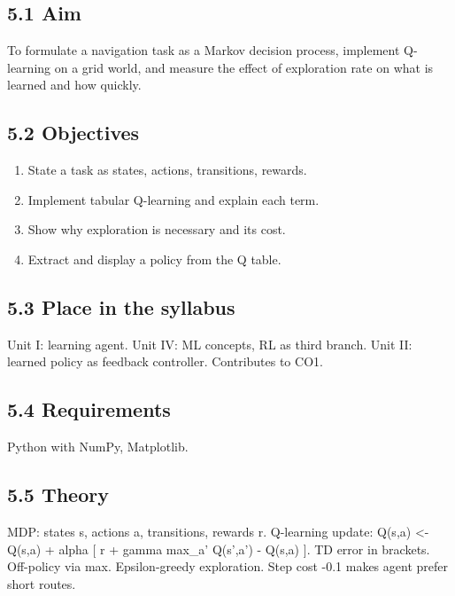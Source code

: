 \documentclass[
]{article}
\providecommand{\tightlist}{%
  \setlength{\itemsep}{0pt}\setlength{\parskip}{0pt}}
\begin{document}
\subsection{5.1 Aim}\label{aim-4}

To formulate a navigation task as a Markov decision process, implement
Q-learning on a grid world, and measure the effect of exploration rate
on what is learned and how quickly.

\subsection{5.2 Objectives}\label{objectives-4}

\begin{enumerate}
\def\labelenumi{\arabic{enumi}.}
\tightlist
\item
  State a task as states, actions, transitions, rewards.
\item
  Implement tabular Q-learning and explain each term.
\item
  Show why exploration is necessary and its cost.
\item
  Extract and display a policy from the Q table.
\end{enumerate}

\subsection{5.3 Place in the syllabus}\label{place-in-the-syllabus-4}

Unit I: learning agent. Unit IV: ML concepts, RL as third branch. Unit
II: learned policy as feedback controller. Contributes to CO1.

\subsection{5.4 Requirements}\label{requirements-4}

Python with NumPy, Matplotlib.

\subsection{5.5 Theory}\label{theory-4}

MDP: states s, actions a, transitions, rewards r. Q-learning update:
Q(s,a) \textless- Q(s,a) + alpha {[} r + gamma max\_a' Q(s',a') - Q(s,a)
{]}. TD error in brackets. Off-policy via max. Epsilon-greedy
exploration. Step cost -0.1 makes agent prefer short routes.
\end{document}
